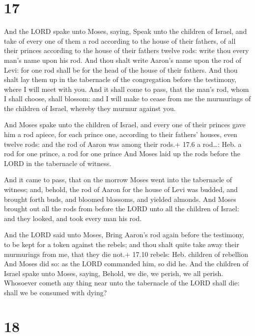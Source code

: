 \hypertarget{section-16}{%
\section{17}\label{section-16}}

 And the LORD spake unto Moses, saying,  Speak
unto the children of Israel, and take of every one of them a rod
according to the house of their fathers, of all their princes according
to the house of their fathers twelve rods: write thou every man's name
upon his rod.  And thou shalt write Aaron's name upon the
rod of Levi: for one rod shall be for the head of the house of their
fathers.  And thou shalt lay them up in the tabernacle of
the congregation before the testimony, where I will meet with you.
 And it shall come to pass, that the man's rod, whom I shall
choose, shall blossom: and I will make to cease from me the murmurings
of the children of Israel, whereby they murmur against you.

 And Moses spake unto the children of Israel, and every
one of their princes gave him a rod apiece, for each prince one,
according to their fathers' houses, even twelve rods: and the rod of
Aaron was among their rods.+ 17.6 a rod\ldots: Heb. a rod for one
prince, a rod for one prince  And Moses laid up the rods
before the LORD in the tabernacle of witness.

 And it came to pass, that on the morrow Moses went into the
tabernacle of witness; and, behold, the rod of Aaron for the house of
Levi was budded, and brought forth buds, and bloomed blossoms, and
yielded almonds.  And Moses brought out all the rods from
before the LORD unto all the children of Israel: and they looked, and
took every man his rod.

 And the LORD said unto Moses, Bring Aaron's rod again
before the testimony, to be kept for a token against the rebels; and
thou shalt quite take away their murmurings from me, that they die not.+
17.10 rebels: Heb. children of rebellion  And Moses did so:
as the LORD commanded him, so did he.  And the children of
Israel spake unto Moses, saying, Behold, we die, we perish, we all
perish.  Whosoever cometh any thing near unto the
tabernacle of the LORD shall die: shall we be consumed with dying?

\hypertarget{section-17}{%
\section{18}\label{section-17}}

